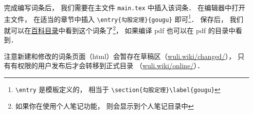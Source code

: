 完成编写词条后， 我们需要在主文件 \lstinline|main.tex| 中插入该词条． 在编辑器中打开主文件， 在适当的章节中插入 \lstinline|\entry{勾股定理}{gougu}| 即可\footnote{\lstinline|\entry| 是模板定义的， 相当于 \lstinline|\section{勾股定理}\label{gougu}|}． 保存后， 我们就可以在\href{http://wuli.wiki/changed}{百科目录}中看到这个词条了\footnote{如果你在使用个人笔记功能， 则会显示到个人笔记目录中}， 如果编译 pdf 也可以在 pdf 的目录中看到．

注意新建和修改的词条页面（html）会暂存在草稿区（\href{http://wuli.wiki/changed/}{wuli.wiki/changed/}）， 只有有权限的用户发布后才会转移到正式目录 （\href{http://wuli.wiki/online/}{wuli.wiki/online/}）．
